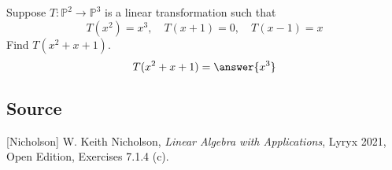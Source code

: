 \documentclass{ximera}
\author{}
\begin{document}
\begin{exercise}
Suppose $T:\mathbb{P}^2\rightarrow \mathbb{P}^3$ is a linear transformation such that $$T(x^2)=x^3,\quad T(x+1)=0,\quad T(x-1)=x$$
Find $T(x^2+x+1)$.
$$T(x^2+x+1)=\answer{x^3}$$

 \end{exercise}

\subsection*{Source}
[Nicholson] W. Keith Nicholson, {\it Linear Algebra with Applications}, Lyryx 2021, Open Edition, Exercises 7.1.4 (c).  
\end{document}
